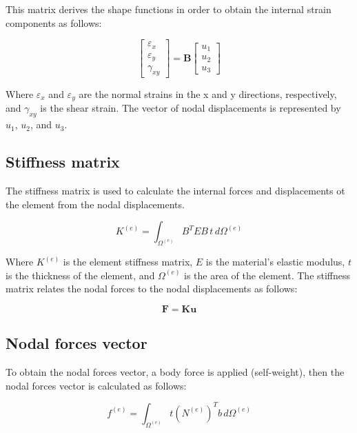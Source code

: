 \documentclass{article}  %
\begin{document}
This matrix derives the shape functions in order to obtain the internal strain components as follows:

\begin{equation}
  \begin{bmatrix}
  \varepsilon_x \\
  \varepsilon_y \\
  \gamma_{xy}
  \end{bmatrix} = \mathbf{B} \begin{bmatrix}
  u_1 \\
  u_2 \\
  u_3
  \end{bmatrix}
\end{equation}

Where $\varepsilon_x$ and $\varepsilon_y$ are the normal strains in the x and y directions, respectively, and $\gamma_{xy}$ is the shear strain. The vector of nodal displacements is represented by $u_1$, $u_2$, and $u_3$.

\subsection{Stiffness matrix}

The stiffness matrix is used to calculate the internal forces and displacements ot the element from the nodal displacements. 

\begin{equation}
  K^{(e)} = \int_{\Omega^{(e)}} B^T E B \, t \, d\Omega^{(e)}
\end{equation}

Where $K^{(e)}$ is the element stiffness matrix, $E$ is the material's elastic modulus, $t$ is the thickness of the element, and $\Omega^{(e)}$ is the area of the element. The stiffness matrix relates the nodal forces to the nodal displacements as follows:

\begin{equation}
  \mathbf{F} = \mathbf{K} \mathbf{u}
\end{equation}

\subsection{Nodal forces vector}

To obtain the nodal forces vector, a body force is applied (self-weight), then the nodal forces vector is calculated as follows:

\begin{equation}
  f^{(e)} = \int_{\Omega^{(e)}} t \left( N^{(e)} \right)^T b \, d\Omega^{(e)}
\end{equation}
\end{document}
